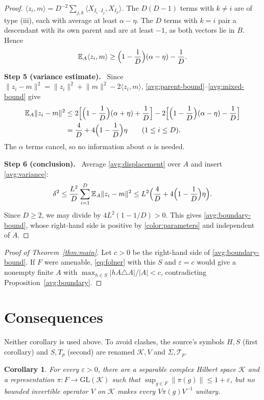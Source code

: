 \documentclass[11pt]{article}
\newcommand{\norm}[1]{\lVert #1\rVert}
\newcommand{\ip}[2]{\langle #1,#2\rangle}
\newcommand{\step}[1]{\par\smallskip\noindent\textbf{Step #1.}\ }
\newtheorem{corollary}[theorem]{Corollary}
\theoremstyle{definition}
\numberwithin{equation}{section}
\begin{document}
\begin{proof}
\emph{$\ip{z_i}{m}=D^{-2}\sum_{j,k}\ip{X_{I_i\cdot I_j}}{X_{I_k}}$.} The
$D(D-1)$ terms with $k\ne i$ are of type (iii), each with average at least
$\alpha-\eta$. The $D$ terms with $k=i$ pair a descendant with its own
parent and are at least $-1$, as both vectors lie in $B$. Hence
\begin{equation}\label{avg:mixed-bound}
  \mathbb E_A\ip{z_i}{m}\ge\Bigl(1-\frac1D\Bigr)(\alpha-\eta)-\frac1D .
\end{equation}

\step{5 (variance estimate)} Since
$\norm{z_i-m}^2=\norm{z_i}^2+\norm{m}^2-2\ip{z_i}{m}$,
\eqref{avg:parent-bound}--\eqref{avg:mixed-bound} give
\begin{align}
  \mathbb E_A\norm{z_i-m}^2
  &\le2\Bigl[\Bigl(1-\frac1D\Bigr)(\alpha+\eta)+\frac1D\Bigr]
     -2\Bigl[\Bigl(1-\frac1D\Bigr)(\alpha-\eta)-\frac1D\Bigr]\notag\\
  &=\frac4D+4\Bigl(1-\frac1D\Bigr)\eta\qquad(1\le i\le D).
  \label{avg:variance}
\end{align}
The $\alpha$ terms cancel, so no information about $\alpha$ is needed.

\step{6 (conclusion)} Average \eqref{avg:displacement} over $A$ and insert
\eqref{avg:variance}:
\[
  \delta^2\le\frac{L^2}{D}\sum_{i=1}^D\mathbb E_A\norm{z_i-m}^2
  \le L^2\Bigl(\frac4D+4\Bigl(1-\frac1D\Bigr)\eta\Bigr).
\]
Since $D\ge2$, we may divide by $4L^2(1-1/D)>0$. This gives
\eqref{avg:boundary-bound}, whose right-hand side is positive by
\eqref{color:parameters} and independent of $A$.
\end{proof}

\begin{proof}[Proof of Theorem~\ref{thm:main}]
Let $c>0$ be the right-hand side of \eqref{avg:boundary-bound}. If $F$ were
amenable, \eqref{eq:folner} with this $S$ and $\varepsilon=c$ would give a
nonempty finite $A$ with $\max_{h\in S}|hA\triangle A|/|A|<c$, contradicting
Proposition~\ref{avg:boundary}.
\end{proof}

\section{Consequences}\label{sec:consequences}

Neither corollary is used above. To avoid clashes, the source's symbols
$H,S$ (first corollary) and $S,T_p$ (second) are renamed
$\mathcal K,V$ and $\Sigma,\mathcal T_p$.

\begin{corollary}\label{cor:nonunitarizable}
For every \(\varepsilon>0\), there are a separable complex Hilbert space
\(\mathcal K\) and a representation \(\pi:F\to\mathrm{GL}(\mathcal K)\) such
that \(\sup_{g\in F}\norm{\pi(g)}\le1+\varepsilon\), but no bounded
invertible operator \(V\) on \(\mathcal K\) makes every \(V\pi(g)V^{-1}\)
unitary.
\end{corollary}
\end{document}
